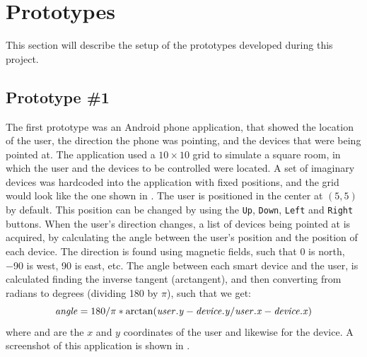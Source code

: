 \section{Prototypes}
This section will describe the setup of the prototypes developed during this project.

\subsection{Prototype \#1}
\label{sec:implementation:prototypes:prototype1}
The first prototype was an Android phone application, 
that showed the location of the user, 
the direction the phone was pointing, 
and the devices that were being pointed at.
The application used a $10 \times 10$ grid to simulate a square room, 
in which the user and the devices to be controlled were located.
A set of imaginary devices was hardcoded into the application with fixed positions, 
and the grid would look like the one shown in .
The user is positioned in the center at $(5,5)$ by default. 
This position can be changed by using the \texttt{Up}, \texttt{Down}, \texttt{Left} and \texttt{Right} buttons.
When the user's direction changes, 
a list of devices being pointed at is acquired, 
by calculating the angle between the user's position and the position of each device.
The direction is found using magnetic fields, 
such that \num{0} is north, \num{-90} is west, \num{90} is east, etc. 
The angle between each smart device and the user, 
is calculated finding the inverse tangent (arctangent), 
and then converting from radians to degrees (dividing \num{180} by $\pi$), 
such that we get:
\begin{equation}\label{eq:angle}
\var{angle} = 180 / \pi * \arctan(\var{user.y} - \var{device.y} / \var{user.x} - \var{device.x})
\end{equation}
where  and  are the $x$ and $y$ coordinates of the user and likewise for the device.
A screenshot of this application is shown in .

